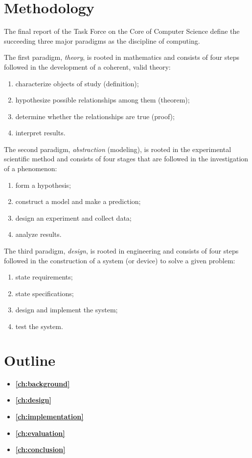 \section{Methodology}\label{sec:methodology}
The final report of the Task Force on the Core of Computer Science\cite{computing_as_a_discipline} define the succeeding three major paradigms as the discipline of computing.

The first paradigm, \emph{theory}, is rooted in mathematics and consists of four steps followed in the development of a coherent, valid theory: 
\begin{enumerate}
    \item characterize objects of study (definition);
    \item hypothesize possible relationships among them (theorem);
    \item determine whether the relationships are true (proof); 
    \item interpret results.
\end{enumerate}

The second paradigm, \emph{abstraction} (modeling), is rooted in the experimental scientific method and consists of four stages that are followed in the investigation of a phenomenon: 
\begin{enumerate}
    \item form a hypothesis;
    \item construct a model and make a prediction;
    \item design an experiment and collect data;
    \item analyze results.
\end{enumerate}

The third paradigm, \emph{design}, is rooted in engineering and consists of four steps followed in the construction of a system (or device) to solve a given problem:
\begin{enumerate}
    \item state requirements; 
    \item state specifications;
    \item design and implement the system;
    \item test the system.
\end{enumerate}

\section{Outline}\label{sec:outline}
\begin{itemize}
    \item[] \textbf{\autoref{ch:background}}
    \item[] \textbf{\autoref{ch:design}}
    \item[] \textbf{\autoref{ch:implementation}}
    \item[] \textbf{\autoref{ch:evaluation}}
    \item[] \textbf{\autoref{ch:conclusion}}
\end{itemize}